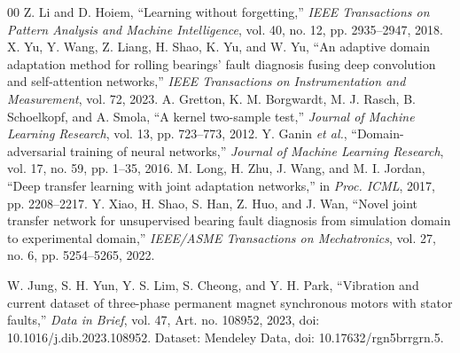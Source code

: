 \documentclass[conference,letterpaper]{IEEEtran}\IEEEoverridecommandlockouts
\begin{document}
\begin{thebibliography}{00}
 Z. Li and D. Hoiem, ``Learning without forgetting,'' \emph{IEEE Transactions on Pattern Analysis and Machine Intelligence}, vol. 40, no. 12, pp. 2935--2947, 2018.
 X. Yu, Y. Wang, Z. Liang, H. Shao, K. Yu, and W. Yu, ``An adaptive domain adaptation method for rolling bearings' fault diagnosis fusing deep convolution and self-attention networks,'' \emph{IEEE Transactions on Instrumentation and Measurement}, vol. 72, 2023.
 A. Gretton, K. M. Borgwardt, M. J. Rasch, B. Schoelkopf, and A. Smola, ``A kernel two-sample test,'' \emph{Journal of Machine Learning Research}, vol. 13, pp. 723--773, 2012.
 Y. Ganin \emph{et al.}, ``Domain-adversarial training of neural networks,'' \emph{Journal of Machine Learning Research}, vol. 17, no. 59, pp. 1--35, 2016.
 M. Long, H. Zhu, J. Wang, and M. I. Jordan, ``Deep transfer learning with joint adaptation networks,'' in \emph{Proc. ICML}, 2017, pp. 2208--2217.
 Y. Xiao, H. Shao, S. Han, Z. Huo, and J. Wan, ``Novel joint transfer network for unsupervised bearing fault diagnosis from simulation domain to experimental domain,'' \emph{IEEE/ASME Transactions on Mechatronics}, vol. 27, no. 6, pp. 5254--5265, 2022.

 W. Jung, S. H. Yun, Y. S. Lim, S. Cheong, and Y. H. Park, ``Vibration and current dataset of three-phase permanent magnet synchronous motors with stator faults,'' \emph{Data in Brief}, vol. 47, Art. no. 108952, 2023, doi: 10.1016/j.dib.2023.108952. Dataset: Mendeley Data, doi: 10.17632/rgn5brrgrn.5.
\end{thebibliography}
\end{document}

